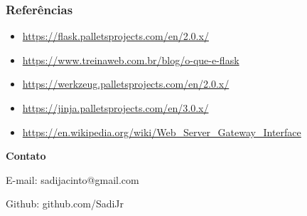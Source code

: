 \documentclass[t]{beamer}
\begin{document}
\begin{frame}
	\frametitle{Referências}
	\begin{itemize}
		\item \url{https://flask.palletsprojects.com/en/2.0.x/}
		\item \url{https://www.treinaweb.com.br/blog/o-que-e-flask}
		\item \url{https://werkzeug.palletsprojects.com/en/2.0.x/}
		\item \url{https://jinja.palletsprojects.com/en/3.0.x/}
		\item \url{https://en.wikipedia.org/wiki/Web\_Server\_Gateway\_Interface}
	\end{itemize}
\end{frame}
{
	\begin{frame}[plain]
		\vspace{15mm}
		\begin{center}
			\textcolor{cinza}{
				\textbf{Contato}
			}
		\end{center}
		\vspace{-6mm}
		\begin{center}
			\textcolor{cinza}{\scriptsize{
				E-mail: sadijacinto@gmail.com
			}}
		\end{center}
		\vspace{-6mm}
		\begin{center}
			\textcolor{cinza}{\scriptsize{
				Github: github.com/SadiJr
			}}
		\end{center}
	\end{frame}
}
\end{document}
